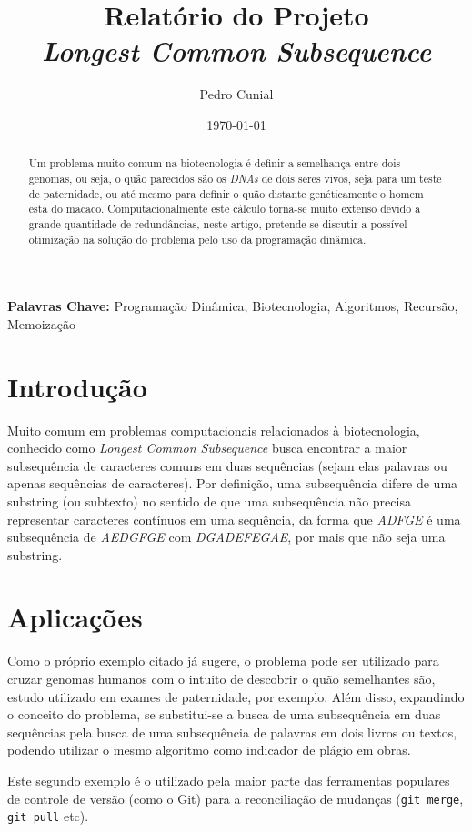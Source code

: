 \documentclass[11pt]{article}
\author{Pedro Cunial}
\date{\today}
\title{Relatório do Projeto\\
  \large \emph{Longest Common Subsequence}}
\begin{document}
\maketitle
\tableofcontents

\begin{abstract}
  Um problema muito comum na biotecnologia é definir a semelhança entre dois
  genomas, ou seja, o quão parecidos são os \emph{DNAs} de dois seres vivos, seja para
  um teste de paternidade, ou até mesmo para definir o quão distante
  genéticamente o homem está do macaco. Computacionalmente este cálculo torna-se muito
  extenso devido a grande quantidade de redundâncias, neste artigo, pretende-se
  discutir a possível otimização na solução do problema pelo uso da programação dinâmica.
\end{abstract}

\textbf{Palavras Chave:} Programação Dinâmica, Biotecnologia, Algoritmos,
Recursão, Memoização

\section{Introdução}
Muito comum em problemas computacionais relacionados à biotecnologia, conhecido
como \emph{Longest Common Subsequence} busca encontrar a maior subsequência de
caracteres comuns em duas sequências (sejam elas palavras ou apenas sequências
de caracteres). Por definição, uma subsequência difere de uma substring (ou
subtexto) no sentido de que uma subsequência não precisa representar caracteres
contínuos em uma sequência, da forma que \emph{ADFGE} é uma subsequência de
\emph{AEDGFGE} com \emph{DGADEFEGAE}, por mais que não seja uma substring.

\section{Aplicações}

Como o próprio exemplo citado já sugere, o problema pode ser utilizado para
cruzar genomas humanos com o intuito de descobrir o quão semelhantes são, estudo
utilizado em exames de paternidade, por exemplo. Além disso, expandindo o
conceito do problema, se substitui-se a busca de uma subsequência em duas
sequências pela busca de uma subsequência de palavras em dois livros ou textos,
podendo utilizar o mesmo algoritmo como indicador de plágio em obras.

Este segundo exemplo é o utilizado pela maior parte das ferramentas populares de
controle de versão (como o Git) para a reconciliação de mudanças (\texttt{git
  merge}, \texttt{git pull} etc).
\end{document}
